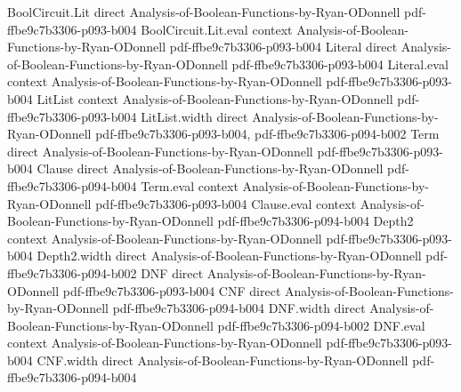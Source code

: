 \begin{lemma}
\label{BooleanAnalysis.fourierCoeff_empty}
\leanok
{}
\proofstep
  {BoolCircuit.Lit}
  {direct}
  {Analysis-of-Boolean-Functions-by-Ryan-ODonnell}
  {pdf-ffbe9c7b3306-p093-b004}
\proofstep
  {BoolCircuit.Lit.eval}
  {context}
  {Analysis-of-Boolean-Functions-by-Ryan-ODonnell}
  {pdf-ffbe9c7b3306-p093-b004}
\proofstep
  {Literal}
  {direct}
  {Analysis-of-Boolean-Functions-by-Ryan-ODonnell}
  {pdf-ffbe9c7b3306-p093-b004}
\proofstep
  {Literal.eval}
  {context}
  {Analysis-of-Boolean-Functions-by-Ryan-ODonnell}
  {pdf-ffbe9c7b3306-p093-b004}
\proofstep
  {LitList}
  {context}
  {Analysis-of-Boolean-Functions-by-Ryan-ODonnell}
  {pdf-ffbe9c7b3306-p093-b004}
\proofstep
  {LitList.width}
  {direct}
  {Analysis-of-Boolean-Functions-by-Ryan-ODonnell}
  {pdf-ffbe9c7b3306-p093-b004,
    pdf-ffbe9c7b3306-p094-b002}
\proofstep
  {Term}
  {direct}
  {Analysis-of-Boolean-Functions-by-Ryan-ODonnell}
  {pdf-ffbe9c7b3306-p093-b004}
\proofstep
  {Clause}
  {direct}
  {Analysis-of-Boolean-Functions-by-Ryan-ODonnell}
  {pdf-ffbe9c7b3306-p094-b004}
\proofstep
  {Term.eval}
  {context}
  {Analysis-of-Boolean-Functions-by-Ryan-ODonnell}
  {pdf-ffbe9c7b3306-p093-b004}
\proofstep
  {Clause.eval}
  {context}
  {Analysis-of-Boolean-Functions-by-Ryan-ODonnell}
  {pdf-ffbe9c7b3306-p094-b004}
\proofstep
  {Depth2}
  {context}
  {Analysis-of-Boolean-Functions-by-Ryan-ODonnell}
  {pdf-ffbe9c7b3306-p093-b004}
\proofstep
  {Depth2.width}
  {direct}
  {Analysis-of-Boolean-Functions-by-Ryan-ODonnell}
  {pdf-ffbe9c7b3306-p094-b002}
\proofstep
  {DNF}
  {direct}
  {Analysis-of-Boolean-Functions-by-Ryan-ODonnell}
  {pdf-ffbe9c7b3306-p093-b004}
\proofstep
  {CNF}
  {direct}
  {Analysis-of-Boolean-Functions-by-Ryan-ODonnell}
  {pdf-ffbe9c7b3306-p094-b004}
\proofstep
  {DNF.width}
  {direct}
  {Analysis-of-Boolean-Functions-by-Ryan-ODonnell}
  {pdf-ffbe9c7b3306-p094-b002}
\proofstep
  {DNF.eval}
  {context}
  {Analysis-of-Boolean-Functions-by-Ryan-ODonnell}
  {pdf-ffbe9c7b3306-p093-b004}
\proofstep
  {CNF.width}
  {direct}
  {Analysis-of-Boolean-Functions-by-Ryan-ODonnell}
  {pdf-ffbe9c7b3306-p094-b004}

\end{lemma}
